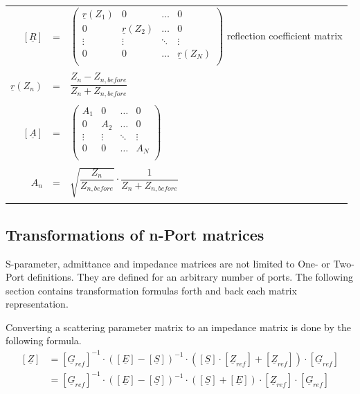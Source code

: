 \begin{tabular}{rll}
$\left[\underline{R}\right]$ & = &
$\begin{pmatrix}
\underline{r}\left(Z_{1}\right) & 0 & \ldots & 0\\
0 & \underline{r}\left(Z_{2}\right) & \ldots & 0\\
\vdots & \vdots & \ddots & \vdots\\
0 & 0 & \ldots & \underline{r}\left(Z_{N}\right)\\
\end{pmatrix}$
reflection coefficient matrix\\& &\\
$\underline{r}\left(Z_{n}\right)$ & = &
$\dfrac{Z_{n} - Z_{n,before}}{Z_{n} + Z_{n,before}}$\\& &\\
$\left[\underline{A}\right]$ & = &
$\begin{pmatrix}
A_1 & 0 & \ldots & 0\\
0 & A_2 & \ldots & 0\\
\vdots & \vdots & \ddots & \vdots\\
0 & 0 & \ldots & A_N\\
\end{pmatrix}$\\& &\\
$A_n$ & = &
$\sqrt{\dfrac{Z_n}{Z_{n,before}}}\cdot\dfrac{1}{Z_{n} + Z_{n,before}}$\\& &\\
\end{tabular}

\subsection{Transformations of n-Port matrices}

S-parameter, admittance and impedance matrices are not limited to One-
or Two-Port definitions.  They are defined for an arbitrary number of
ports.  The following section contains transformation formulas forth
and back each matrix representation.

\addvspace{12pt}

Converting a scattering parameter matrix to an impedance matrix is
done by the following formula.
\begin{align}
\left[
\underline{Z}
\right]
&=
\left[
\underline{G}_{ref}
\right]^{-1}
\cdot
\left(
\left[\underline{E}\right] - \left[\underline{S}\right]
\right)^{-1}
\cdot
\left(
\left[\underline{S}\right] \cdot \left[\underline{Z}_{ref}\right] + \left[\underline{Z}_{ref}\right]
\right)
\cdot
\left[\underline{G}_{ref}\right]\\
&=
\left[
\underline{G}_{ref}
\right]^{-1}
\cdot
\left(
\left[\underline{E}\right] - \left[\underline{S}\right]
\right)^{-1}
\cdot
\left(
\left[\underline{S}\right] + \left[\underline{E}\right]
\right)
\cdot \left[\underline{Z}_{ref}\right]
\cdot \left[\underline{G}_{ref}\right]
\end{align}

